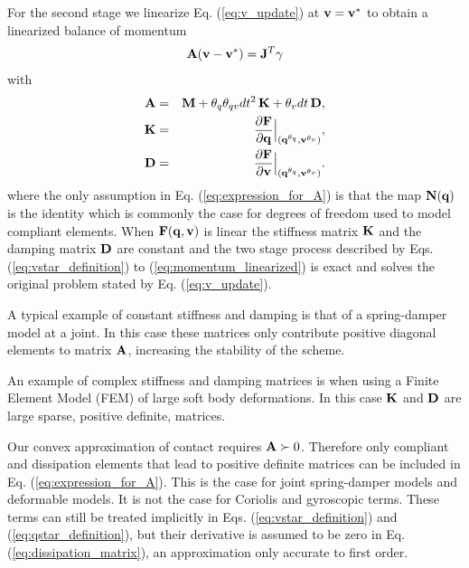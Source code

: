 For the second stage we linearize Eq. (\ref{eq:v_update})
at ${\mathbf{v}} = {\mathbf{v}}^*$ to obtain a linearized balance of momentum
\begin{eqnarray}
	\mf{A}(\mf{v}-\mf{v}^*)= \mf{J}^T\mf{\gamma}
	\label{eq:momentum_linearized}
\end{eqnarray}
with
\begin{eqnarray}
	\mf{A}&=&\mf{M}+\theta_q\theta_{qv} dt^2\,\mf{K}+\theta_v dt\,\mf{D},
	\label{eq:expression_for_A}\\
	\mf{K}&=&\frac{\partial \mf{F}}{\partial \mf{q}}\Bigr|_{(\mf{q}^{\theta_q}, \mf{v}^{\theta_v})},\\
	\mf{D}&=&\frac{\partial \mf{F}}{\partial \mf{v}}\Bigr|_{(\mf{q}^{\theta_q},
	\mf{v}^{\theta_v})}.
	\label{eq:dissipation_matrix}
\end{eqnarray}
where the only assumption in Eq. (\ref{eq:expression_for_A}) is that the map
${\mathbf{N}}({\mathbf{q}})$ is the identity 
 which is commonly the case for degrees of
freedom used to model compliant elements. When ${\mathbf{F}}({\mathbf{q}}, {\mathbf{v}})$ is
linear the stiffness matrix ${\mathbf{K}}$ and the damping matrix ${\mathbf{D}}$ are
constant and the two stage process described by Eqs. (\ref{eq:vstar_definition})
to (\ref{eq:momentum_linearized}) is exact and solves the original problem
stated by Eq. (\ref{eq:v_update}).


A typical example of constant stiffness and damping is that of a spring-damper
model at a joint. In this case these matrices only contribute positive diagonal
elements to matrix ${\mathbf{A}}$, increasing the stability of the scheme.

An example of complex stiffness and damping matrices is when using a Finite
Element Model (FEM) of large soft body deformations. In this case ${\mathbf{K}}$ and
${\mathbf{D}}$ are large sparse, positive definite, matrices.

Our convex approximation of contact requires ${\mathbf{A}}\succ 0$. Therefore only
compliant and dissipation elements that lead to positive definite matrices can
be included in Eq. (\ref{eq:expression_for_A}). This is the case for joint
spring-damper models and deformable models. It is not the case for Coriolis and
gyroscopic terms. 
These terms can still be treated implicitly in Eqs.
(\ref{eq:vstar_definition}) and (\ref{eq:qstar_definition}), but their
derivative is assumed to be zero in Eq. (\ref{eq:dissipation_matrix}), an
approximation only accurate to first order.

